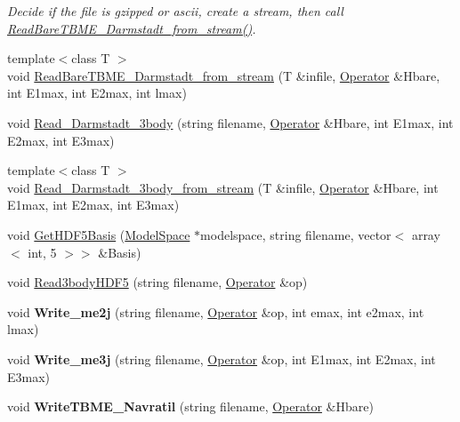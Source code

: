 \begin{DoxyCompactItemize}
\begin{DoxyCompactList}\small\item\em Decide if the file is gzipped or ascii, create a stream, then call \hyperlink{classReadWrite_a44acf6835321a8bee6a795523728da2e}{Read\-Bare\-T\-B\-M\-E\-\_\-\-Darmstadt\-\_\-from\-\_\-stream()}. \end{DoxyCompactList}\item 
{\footnotesize template$<$class T $>$ }\\void \hyperlink{classReadWrite_a44acf6835321a8bee6a795523728da2e}{Read\-Bare\-T\-B\-M\-E\-\_\-\-Darmstadt\-\_\-from\-\_\-stream} (T \&infile, \hyperlink{classOperator}{Operator} \&Hbare, int E1max, int E2max, int lmax)
\item 
void \hyperlink{classReadWrite_a84c0cbaf2be415eadffb560ea0bb9785}{Read\-\_\-\-Darmstadt\-\_\-3body} (string filename, \hyperlink{classOperator}{Operator} \&Hbare, int E1max, int E2max, int E3max)
\item 
{\footnotesize template$<$class T $>$ }\\void \hyperlink{classReadWrite_af229332b05276f686966fdaaa98a81fd}{Read\-\_\-\-Darmstadt\-\_\-3body\-\_\-from\-\_\-stream} (T \&infile, \hyperlink{classOperator}{Operator} \&Hbare, int E1max, int E2max, int E3max)
\item 
void \hyperlink{classReadWrite_ad03f489c69c98d3ff1d33fbe9801c3d1}{Get\-H\-D\-F5\-Basis} (\hyperlink{classModelSpace}{Model\-Space} $\ast$modelspace, string filename, vector$<$ array$<$ int, 5 $>$$>$ \&Basis)
\item 
void \hyperlink{classReadWrite_a52656073ac0fa73c78dbd67c0f0e81e3}{Read3body\-H\-D\-F5} (string filename, \hyperlink{classOperator}{Operator} \&op)
\item 
\hypertarget{classReadWrite_ac4e620913e1aa49ef541d2a0b7c631c5}{void {\bfseries Write\-\_\-me2j} (string filename, \hyperlink{classOperator}{Operator} \&op, int emax, int e2max, int lmax)}\label{classReadWrite_ac4e620913e1aa49ef541d2a0b7c631c5}

\item 
\hypertarget{classReadWrite_a3aef884e7dca533e3abd10abf67feedb}{void {\bfseries Write\-\_\-me3j} (string filename, \hyperlink{classOperator}{Operator} \&op, int E1max, int E2max, int E3max)}\label{classReadWrite_a3aef884e7dca533e3abd10abf67feedb}

\item 
\hypertarget{classReadWrite_a2b803d12e3fb1236f9fd80cb00de32a2}{void {\bfseries Write\-T\-B\-M\-E\-\_\-\-Navratil} (string filename, \hyperlink{classOperator}{Operator} \&Hbare)}\label{classReadWrite_a2b803d12e3fb1236f9fd80cb00de32a2}


\end{DoxyCompactItemize}
